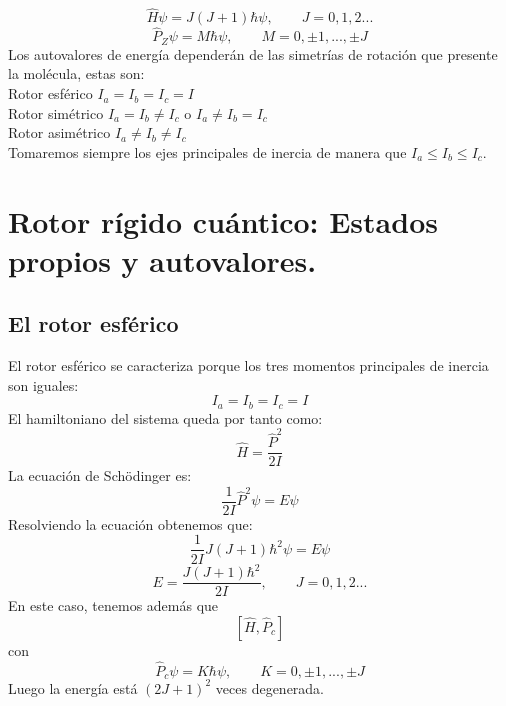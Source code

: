 \documentclass[a4paper]{article}
\begin{document}
\begin{equation}
\hat H\psi = J(J+1)\hbar \psi, \qquad J=0,1,2...
\end{equation}
\begin{equation}
\hat P_Z\psi = M\hbar\psi, \qquad M = 0,\pm 1,...,\pm J
\end{equation}
Los autovalores de energía dependerán de las simetrías de rotación que presente la molécula, estas son:\\
Rotor esférico $I_a=I_b=I_c= I$ \\
Rotor simétrico $I_a=I_b \neq I_c$ o $I_a\neq I_b=I_c$\\
Rotor asimétrico $I_a \neq I_b \neq I_c$\\
Tomaremos siempre los ejes principales de inercia de manera que $I_a\leq I_b\leq I_c$.
\section{Rotor rígido cuántico: Estados propios y autovalores.}
\subsection{El rotor esférico}
El rotor esférico se caracteriza porque los tres momentos principales de inercia son iguales: $$I_a=I_b=I_c= I$$
El hamiltoniano del sistema queda por tanto como:
\begin{equation}
\hat H = \frac{\hat P^2}{2I}
\end{equation}
La ecuación de Schödinger es:
\begin{equation}
\frac{1}{2I}\hat P^2 \psi = E\psi
\end{equation}
Resolviendo la ecuación obtenemos que:$$\frac{1}{2I}J(J+1)\hbar^2\psi=E\psi$$
\begin{equation}
E=\frac{J(J+1)\hbar^2}{2I}, \qquad J=0,1,2...
\end{equation}
En este caso, tenemos además que
\begin{equation}
\left[\hat H,\hat P_c \right]
\end{equation}
con $$\hat P_c \psi = K\hbar\psi, \qquad K = 0, \pm 1,..., \pm J$$
Luego la energía está $(2J+1)^2$ veces degenerada.
\end{document}
